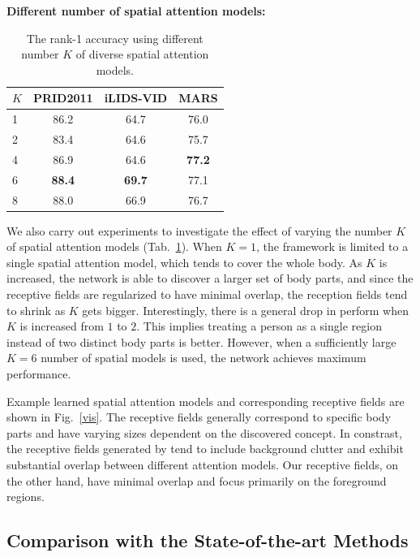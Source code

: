 \textbf{Different number of spatial attention models:}
\begin{table}
\center
\begin{adjustbox}{max width=0.8\textwidth}
\begin{tabular}{lccc} 
\textsc{$K$} & PRID2011 & iLIDS-VID & MARS \\
\hline
1   &86.2     &64.7    &76.0  \\ 
2   &83.4     &64.6    &75.7  \\ 
4   &86.9     &64.6    &\textbf{77.2} \\ 
6   &\textbf{88.4}  &\textbf{69.7}     &77.1 \\ 
8   &88.0     &66.9   &76.7 \\ 
\hline
\end{tabular}
\end{adjustbox}
\caption{The rank-1 accuracy using different number $K$ of diverse spatial attention models.}
\label{tab:number}
\end{table}
We also carry out experiments to investigate the effect of varying the number $K$ of spatial attention models (Tab.~\ref{tab:number}).
When $K=1$, the framework is limited to a single spatial attention model, which tends to cover the whole body.  As $K$ is increased, the network is able to discover a larger set of body parts, and since the receptive fields are regularized to have minimal overlap, the reception fields tend to shrink as $K$ gets bigger.  Interestingly, there is a general drop in perform when $K$ is increased from $1$ to $2$. This implies treating a person as a single region instead of two distinct body parts is better. However, when a sufficiently large $K=6$ number of spatial models is used, the network achieves maximum performance. 

Example learned spatial attention models and corresponding receptive fields are shown in Fig.~\ref{vis}.  The receptive fields generally correspond to specific body parts and have varying sizes dependent on the discovered concept.  In constrast, the receptive fields generated by \cite{liu2017hydraplus} tend to include background clutter and exhibit substantial overlap between different attention models.  Our receptive fields, on the other hand, have minimal overlap and focus primarily on the foreground regions.

\subsection{Comparison with the State-of-the-art Methods}

